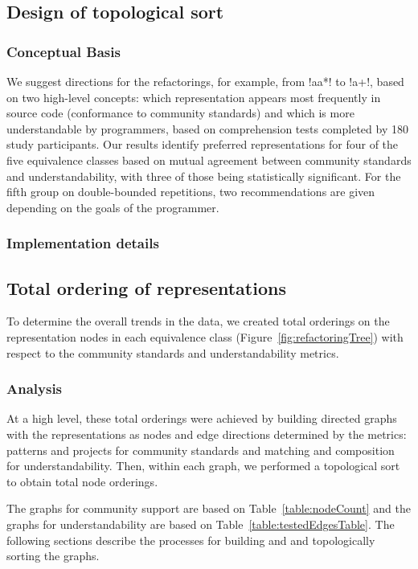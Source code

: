 \subsection{Design of topological sort}
\label{sec:ordering}

\subsubsection{Conceptual Basis}

We suggest directions for the refactorings, for example, from \cverb!aa*!  to  \cverb!a+!, based on two high-level concepts: which representation appears most frequently in source code (conformance to community standards) and which is more understandable by programmers, based on comprehension tests completed by 180 study participants.
Our results identify preferred representations for four of the five equivalence classes based on mutual agreement between community standards and understandability, with three of those being statistically significant. For the fifth group on double-bounded repetitions, two recommendations are given depending on the goals of the programmer.
\subsubsection{Implementation details}

\subsection{Total ordering of representations}
To determine the overall trends in the data, we created total orderings on the representation nodes in each equivalence class (Figure~\ref{fig:refactoringTree})  with respect to the community standards and understandability metrics.

\subsubsection{Analysis}
At a high level, these total orderings were achieved by building directed graphs with the representations as nodes and edge directions determined by the metrics: patterns and projects for community standards and matching and composition for understandability. Then, within each graph, we performed a topological sort to obtain total node orderings.

The graphs for community support are based on Table~\ref{table:nodeCount} and the graphs for understandability are based on Table~\ref{table:testedEdgesTable}. The following sections describe the processes for building and and topologically sorting the graphs.

